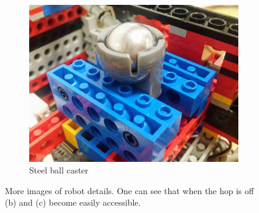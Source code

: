 \begin{figure}[ht]
\begin{subfigure}{0.4\textwidth}
        \includegraphics[width=\linewidth]{res/robot-pics/ball-caster-wheel.jpg}
        \caption{Steel ball caster}
    \end{subfigure}
    \caption{More images of robot details. One can see that when the hop is off (b) and (c) become easily accessible.}
\end{figure}
